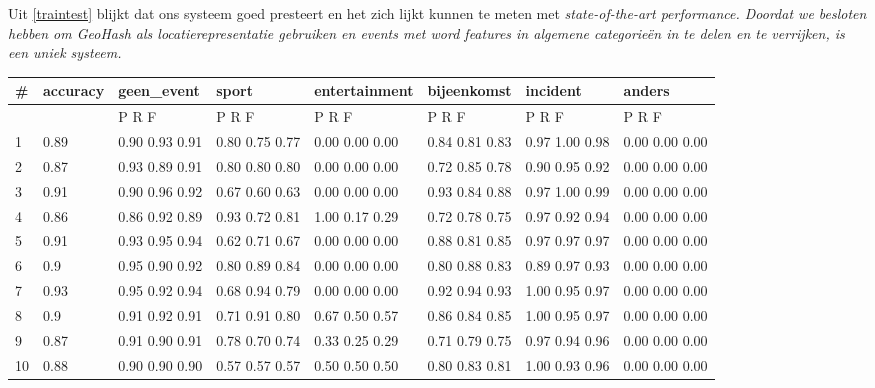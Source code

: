 {{Uit \ref{traintest} blijkt dat ons systeem goed presteert en het zich lijkt kunnen te meten met \it{state-of-the-art performance}. Doordat we 
besloten hebben om GeoHash als locatierepresentatie gebruiken en events met word features in algemene categorie\"en in te delen 
en te verrijken, is  een uniek systeem.
\newpage
{}\label{bijlage}

\captionsetup{hypcap=false}

%
{\begin{tabular}{llllllll}
\hline
 \#    & accuracy   & geen\_event     & sport          & entertainment   & bijeenkomst    & incident       & anders         \\
\hline
      &            & P    R    F    & P    R    F    & P    R    F     & P    R    F    & P    R    F    & P    R    F    \\
 1    & 0.89       & 0.90 0.93 0.91 & 0.80 0.75 0.77 & 0.00 0.00 0.00  & 0.84 0.81 0.83 & 0.97 1.00 0.98 & 0.00 0.00 0.00 \\
 2    & 0.87       & 0.93 0.89 0.91 & 0.80 0.80 0.80 & 0.00 0.00 0.00  & 0.72 0.85 0.78 & 0.90 0.95 0.92 & 0.00 0.00 0.00 \\
 3    & 0.91       & 0.90 0.96 0.92 & 0.67 0.60 0.63 & 0.00 0.00 0.00  & 0.93 0.84 0.88 & 0.97 1.00 0.99 & 0.00 0.00 0.00 \\
 4    & 0.86       & 0.86 0.92 0.89 & 0.93 0.72 0.81 & 1.00 0.17 0.29  & 0.72 0.78 0.75 & 0.97 0.92 0.94 & 0.00 0.00 0.00 \\
 5    & 0.91       & 0.93 0.95 0.94 & 0.62 0.71 0.67 & 0.00 0.00 0.00  & 0.88 0.81 0.85 & 0.97 0.97 0.97 & 0.00 0.00 0.00 \\
 6    & 0.9        & 0.95 0.90 0.92 & 0.80 0.89 0.84 & 0.00 0.00 0.00  & 0.80 0.88 0.83 & 0.89 0.97 0.93 & 0.00 0.00 0.00 \\
 7    & 0.93       & 0.95 0.92 0.94 & 0.68 0.94 0.79 & 0.00 0.00 0.00  & 0.92 0.94 0.93 & 1.00 0.95 0.97 & 0.00 0.00 0.00 \\
 8    & 0.9        & 0.91 0.92 0.91 & 0.71 0.91 0.80 & 0.67 0.50 0.57  & 0.86 0.84 0.85 & 1.00 0.95 0.97 & 0.00 0.00 0.00 \\
 9    & 0.87       & 0.91 0.90 0.91 & 0.78 0.70 0.74 & 0.33 0.25 0.29  & 0.71 0.79 0.75 & 0.97 0.94 0.96 & 0.00 0.00 0.00 \\
 10   & 0.88       & 0.90 0.90 0.90 & 0.57 0.57 0.57 & 0.50 0.50 0.50  & 0.80 0.83 0.81 & 1.00 0.93 0.96 & 0.00 0.00 0.00 \\

\end{tabular}}}}

